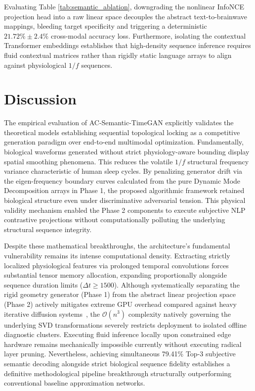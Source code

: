\documentclass[journal]{IEEEtran}
\begin{document}
Evaluating Table \ref{tab:semantic_ablation}, downgrading the nonlinear InfoNCE projection head into a raw linear space decouples the abstract text-to-brainwave mappings, bleeding target specificity and triggering a deterministic $21.72\% \pm 2.4\%$ cross-modal accuracy loss. Furthermore, isolating the contextual Transformer embeddings establishes that high-density sequence inference requires fluid contextual matrices rather than rigidly static language arrays to align against physiological $1/f$ sequences.

\section{Discussion}

The empirical evaluation of AC-Semantic-TimeGAN explicitly validates the theoretical models establishing sequential topological locking as a competitive generation paradigm over end-to-end multimodal optimization. Fundamentally, biological waveforms generated without strict physiology-aware bounding display spatial smoothing phenomena. This reduces the volatile $1/f$ structural frequency variance characteristic of human sleep cycles. By penalizing generator drift via the eigen-frequency boundary curves calculated from the pure Dynamic Mode Decomposition arrays in Phase 1, the proposed algorithmic framework retained biological structure even under discriminative adversarial tension. This physical validity mechanism enabled the Phase 2 components to execute subjective NLP contrastive projections without computationally polluting the underlying structural sequence integrity.

Despite these mathematical breakthroughs, the architecture's fundamental vulnerability remains its intense computational density. Extracting strictly localized physiological features via prolonged temporal convolutions forces substantial tensor memory allocation, expanding proportionally alongside sequence duration limits ($\Delta t \geq 1500$). Although systematically separating the rigid geometry generator (Phase 1) from the abstract linear projection space (Phase 2) actively mitigates extreme GPU overhead compared against heavy iterative diffusion systems~\cite{an2024enhancingeegsignalgeneration}, the $\mathcal{O}(n^3)$ complexity natively governing the underlying SVD transformations severely restricts deployment to isolated offline diagnostic clusters. Executing fluid inference locally upon constrained edge hardware remains mechanically impossible currently without executing radical layer pruning. Nevertheless, achieving simultaneous 79.41\% Top-3 subjective semantic decoding alongside strict biological sequence fidelity establishes a definitive methodological pipeline breakthrough structurally outperforming conventional baseline approximation networks.
\end{document}
